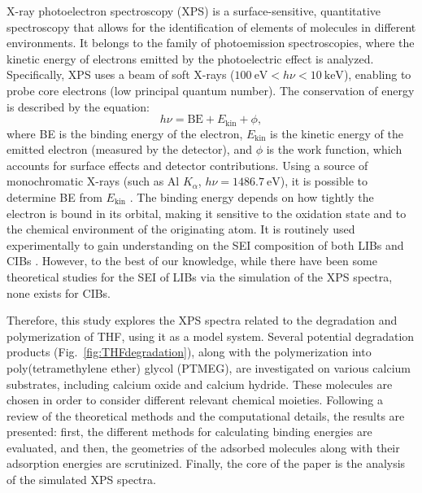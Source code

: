 \documentclass[journal=jpccck,manuscript=article]{achemso}
\begin{document}
X-ray photoelectron spectroscopy (XPS) is a surface-sensitive, quantitative spectroscopy that allows for the identification of elements of molecules in different environments.\cite{brigianoPeculiarOpportunitiesGiven2022} It belongs to the family of photoemission spectroscopies, where the kinetic energy of electrons emitted by the photoelectric effect is analyzed. Specifically, XPS uses a beam of soft X-rays ($\SI{100}{\electronvolt} < h\nu < \SI{10}{\kilo\electronvolt}$), enabling to probe core electrons (low principal quantum number).\cite{stevieIntroductionXrayPhotoelectron2020} The conservation of energy is described by the equation:
\begin{equation}
	h\nu = \text{BE} + E_{\text{kin}} + \phi, \label{eq:xps}
\end{equation}
where BE is the binding energy of the electron, $E_{\text{kin}}$ is the kinetic energy of the emitted electron (measured by the detector), and $\phi$ is the work function, which accounts for surface effects and detector contributions. Using a source of monochromatic X-rays (such as Al $K_\alpha$, $h\nu = \SI{1486.7}{\electronvolt}$), it is possible to determine BE from $E_{\text{kin}}$ \cite{stevieIntroductionXrayPhotoelectron2020}. The binding energy depends on how tightly the electron is bound in its orbital, making it sensitive to the oxidation state and to the chemical environment of the originating atom. It is routinely used experimentally to gain understanding on the SEI composition of both LIBs and CIBs \cite{forero-saboyaUnderstandingNaturePassivation2020a,songElectrolyteOptimizationInterphase2022,bodinBoronBasedFunctionalAdditives2023,melemedImpactDifferentialCa22023,linDecipheringDynamicInterfacial2024}. However, to the best of our knowledge, while there have been some theoretical studies for the SEI of LIBs via the simulation of the XPS spectra\cite{ebadiInsightsLiMetalOrganic2019}, none exists for CIBs.

Therefore, this study explores the XPS spectra related to the degradation and polymerization of THF, using it as a model system. Several potential degradation products (Fig.~\ref{fig:THFdegradation}), along with the polymerization into poly(tetramethylene ether) glycol (PTMEG), are investigated on various calcium substrates, including calcium oxide and calcium hydride. These molecules are chosen in order to consider different relevant chemical moieties. Following a review of the theoretical methods and the computational details, the results are presented: first, the different methods for calculating binding energies are evaluated, and then, the geometries of the adsorbed molecules along with their adsorption energies are scrutinized. Finally, the core of the paper is the analysis of the simulated XPS spectra.
\end{document}
